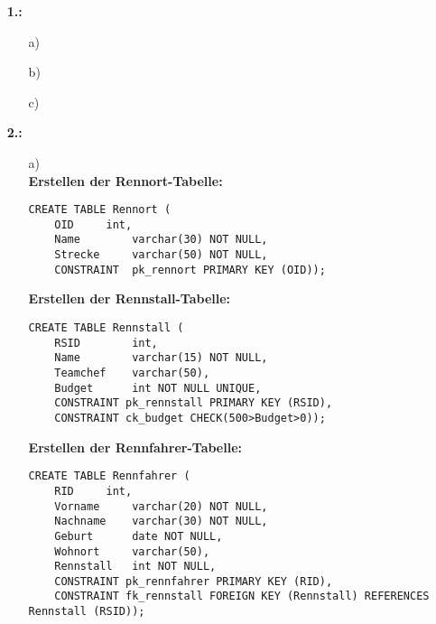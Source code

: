 \documentclass[a4paper,11pt,fleqn]{scrartcl}
\title{\titleinfo}
\author{\authorinfo}
\begin{document}
    \maketitle
	\begin{enumerate}
		\item[\textbf{1.:}]
		\begin{enumerate}
			\item[a)]\quad \\
			\todo
			\item[b)]\quad \\
			\todo
			\item[c)]\quad \\
			\todo
		\end{enumerate}
		
		\item[\textbf{2.:}]
		\begin{enumerate}
			\item[a)]\quad \\
			\textbf{Erstellen der Rennort-Tabelle:}
			\begin{lstlisting}
CREATE TABLE Rennort (
	OID		int,
	Name		varchar(30) NOT NULL,
	Strecke		varchar(50) NOT NULL,
	CONSTRAINT 	pk_rennort PRIMARY KEY (OID));
			\end{lstlisting}

			\textbf{Erstellen der Rennstall-Tabelle:}
			\begin{lstlisting}
CREATE TABLE Rennstall (
	RSID		int,
	Name		varchar(15) NOT NULL,
	Teamchef	varchar(50),
	Budget		int NOT NULL UNIQUE,
	CONSTRAINT pk_rennstall PRIMARY KEY (RSID),
	CONSTRAINT ck_budget CHECK(500>Budget>0));
			\end{lstlisting}

			\textbf{Erstellen der Rennfahrer-Tabelle:}
			\begin{lstlisting}
CREATE TABLE Rennfahrer (
	RID		int,
	Vorname		varchar(20) NOT NULL,
	Nachname	varchar(30) NOT NULL,
	Geburt		date NOT NULL,
	Wohnort		varchar(50),
	Rennstall	int NOT NULL,
	CONSTRAINT pk_rennfahrer PRIMARY KEY (RID),
	CONSTRAINT fk_rennstall FOREIGN KEY (Rennstall) REFERENCES Rennstall (RSID));
			\end{lstlisting}


\end{enumerate}
\end{enumerate}
\end{document}
